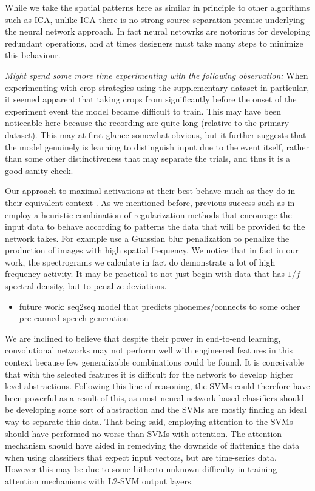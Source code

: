 \documentclass[utf8]{frontiersSCNS} %
\begin{document}
While we take the spatial patterns here as similar in principle to other algorithms such as ICA, unlike ICA there is no strong source separation premise underlying the neural network approach. In fact neural netowrks are notorious for developing redundant operations, and at times designers must take many steps to minimize this behaviour. 

{\em Might spend some more time experimenting with the following observation:} When experimenting with crop strategies using the supplementary dataset in particular, it seemed apparent that taking crops from significantly before the onset of the experiment event the model became difficult to train. This may have been noticeable here because the recording are quite long (relative to the primary dataset). This may at first glance somewhat obvious, but it further suggests that the model genuinely is learning to distinguish input due to the event itself, rather than some other distinctiveness that may separate the trials, and thus it is a good sanity check.

Our approach to maximal activations at their best behave much as they do in their equivalent context . As we mentioned before, previous success such as in \cite{Yosinski2015} employ a heuristic combination of regularization methods that encourage the input data to behave according to patterns the data that will be provided to the network takes. For example \cite{Yosinski2015} use a Guassian blur penalization to penalize the production of images with high spatial frequency. We notice that in fact in our work, the spectrograms we calculate in fact do demonstrate a lot of high frequency activity. It may be practical to not just begin with data that has $1/f$ spectral density, but to penalize deviations.

\begin{itemize}
\item future work: seq2seq model that predicts phonemes/connects to some other pre-canned speech generation
\end{itemize}



We are inclined to believe that despite their power in end-to-end learning, convolutional networks may not perform well with engineered features in this context because few generalizable combinations could be found. It is conceivable that with the selected features it is difficult for the network to develop higher level abstractions. Following this line of reasoning, the SVMs could therefore have been powerful as a result of this, as most neural network based classifiers should be developing some sort of abstraction and the SVMs are mostly finding an ideal way to separate this data. That being said, employing attention to the SVMs should have performed no worse than SVMs with attention. The attention mechanism should have aided in remedying the downside of flattening the data when using classifiers that expect input vectors, but are time-series data. However this may be due to some hitherto unknown difficulty in training attention mechanisms with L2-SVM output layers.
\end{document}
